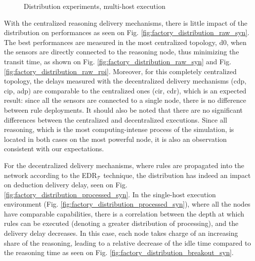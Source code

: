 \documentclass[sw]{iosart2x}
\newcommand{\edrt}{EDR$_{\mathcal{T}}$\xspace}
\begin{document}
\begin{figure}
	\Centering
	\caption{\Centering Distribution experiments, multi-host execution}
	\label{fig:factory_distribution_multi-host}
	
	\begin{minipage}{0.395\textwidth}
		\Centering
		\label{fig:factory_distribution_raw_rpi}
		\scalebox{0.8}{
			
		}
	\end{minipage}
	\begin{minipage}{0.595\textwidth}
		\Centering
		\label{fig:factory_distribution_processed_rpi}
		\scalebox{0.8}{
			
		}
	\end{minipage}
\end{figure}

With the centralized reasoning delivery mechanisms, there is little impact of the distribution on performances as seen on Fig. \ref{fig:factory_distribution_raw_syn}.
The best performances are measured in the most centralized topology, d0, when the sensors are directly connected to the reasoning node, thus minimizing the transit time, as shown on Fig. \ref{fig:factory_distribution_raw_syn} and Fig. \ref{fig:factory_distribution_raw_rpi}.
Moreover, for this completely centralized topology, the delays measured with the decentralized delivery mechanisms (\gls{cdp}, \gls{cip}, \gls{adp}) are comparable to the centralized ones (\gls{cir}, \gls{cdr}), which is an expected result: since all the sensors are connected to a single node, there is no difference between rule deployments.
It should also be noted that there are no significant differences between the centralized and decentralized executions.
Since all reasoning, which is the most computing-intense process of the simulation, is located in both cases on the most powerful node, it is also an observation consistent with our expectations.

For the decentralized delivery mechanisms, where rules are propagated into the network according to the \edrt technique, the distribution has indeed an impact on deduction delivery delay, seen on Fig. \ref{fig:factory_distribution_processed_syn}.
In the single-host execution environment (Fig. \ref{fig:factory_distribution_processed_syn}), where all the nodes have comparable capabilities, there is a correlation between the depth at which rules can be executed (denoting a greater distribution of processing), and the delivery delay decreases.
In this case, each node takes charge of an increasing share of the reasoning, leading to a relative decrease of the idle time compared to the reasoning time as seen on Fig. \ref{fig:factory_distribution_breakout_syn}.
\end{document}
